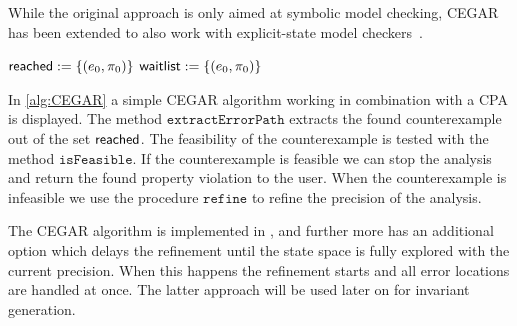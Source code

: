 While the original approach is only aimed at symbolic model checking, \ac{CEGAR} has been extended to also work with explicit-state model checkers~\cite{Beyer:ExplicitCEGAR}.


\begin{algorithm}[t]
\LinesNumbered
 \BlankLine
 $\operatorname{\mathsf{reached}} := \{(e_0, \pi_0)\}$\;
 $\operatorname{\mathsf{waitlist}} := \{(e_0, \pi_0)\}$\;
 \caption{$\CEGARAlgorithm(\DD, e_0, \pi_0)$~\cite{Beyer:ExplicitCEGAR}}
 \label{alg:CEGAR}
\end{algorithm}

In \autoref{alg:CEGAR} a simple \ac{CEGAR} algorithm working in 
combination with a \ac{CPA} is displayed. The method $\mathtt{extractErrorPath}$
extracts the found counterexample out of the set $\operatorname{\mathsf{reached}}$. The feasibility
of the counterexample is tested with the method $\mathtt{isFeasible}$. If the
counterexample is feasible we can stop the analysis and return the found property
violation to the user. When the counterexample is infeasible we use the
procedure $\mathtt{refine}$ to refine the precision of the analysis.

The \ac{CEGAR} algorithm is implemented in \CPAchecker{}, and further more has an additional option which delays the 
refinement until the state space is fully explored with the 
current precision. When this happens the refinement starts and all 
error locations are handled at once. The latter approach will be 
used later on for invariant generation.

\clearpage



